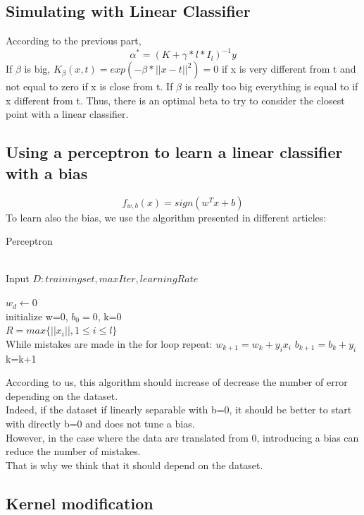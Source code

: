 \documentclass{article} %
\begin{document}
\subsection{Simulating  with Linear Classifier}

According to the previous part, 
\begin{equation*}
\alpha^{*}=(K+\gamma*l*I_{l})^{-1}y
\end{equation*}
If $\beta$ is big, $K_{\beta}(x,t)=exp(-\beta*||x-t||^2)=0$ if x is very different from t and not equal to zero if x is close from t. If $\beta$ is really too big everything is equal to if x different from t. Thus, there is an optimal beta to try to consider the closest point with a linear classifier.

\subsection{Using a perceptron to learn a linear classifier with a bias}
\begin{equation*}
f_{w,b}(x)=sign(w^{T}x+b)
\end{equation*}
To learn also the bias, we use the algorithm presented in different articles: 
\begin{algorithm} [H]
\caption{Perceptron}
\\Input $D: training set, maxIter, learningRate$ 
\begin{algorithmic} [1]
\State $w_d\gets 0$
\\initialize w=0, $b_{0}=0$, k=0
\\$R=max\{||x_{i}||, 1 \leq i \leq l\}$
 \\While mistakes are made in the for loop repeat:
   		     \State $w_{k+1}=w_{k}+y_{i}x_{i}$
		     \State $b_{k+1}=b_{k}+y_{i}$
		     \State k=k+1
  		 \EndIf
	 \EndFor
 \EndFor
\end{algorithmic}
\end{algorithm}

According to us, this algorithm should increase of decrease the number of error depending on the dataset.
\\ Indeed, if the dataset if linearly separable with b=0, it should be better to start with directly b=0 and does not tune a bias. 
\\However, in the case where the data are translated from 0, introducing a bias can reduce the number of mistakes. 
\\That is why we think that it should depend on the dataset. 

\subsection{Kernel modification}
\end{document}
